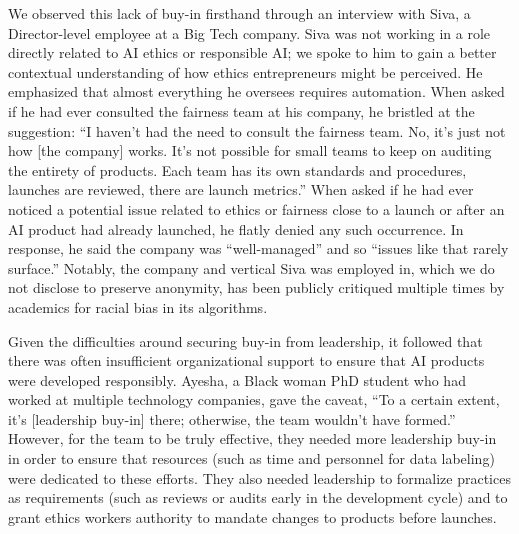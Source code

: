 \documentclass[sigconf]{acmart}
\begin{document}
We observed this lack of buy-in firsthand through an interview with Siva, a Director-level employee at a Big Tech company. Siva was not working in a role directly related to AI ethics or responsible AI; we spoke to him to gain a better contextual understanding of how ethics entrepreneurs might be perceived. He emphasized that almost everything he oversees requires automation. When asked if he had ever consulted the fairness team at his company, he bristled at the suggestion: “I haven’t had the need to consult the fairness team. No, it’s just not how [the company] works. It’s not possible for small teams to keep on auditing the entirety of products. Each team has its own standards and procedures, launches are reviewed, there are launch metrics.” When asked if he had ever noticed a potential issue related to ethics or fairness close to a launch or after an AI product had already launched, he flatly denied any such occurrence. In response, he said the company was “well-managed” and so “issues like that rarely surface.” Notably, the company and vertical Siva was employed in, which we do not disclose to preserve anonymity, has been publicly critiqued multiple times by academics for racial bias in its algorithms.

Given the difficulties around securing buy-in from leadership, it followed that there was often insufficient organizational support to ensure that AI products were developed responsibly. Ayesha, a Black woman PhD student who had worked at multiple technology companies, gave the caveat, “To a certain extent, it’s [leadership buy-in] there; otherwise, the team wouldn’t have formed.” However, for the team to be truly effective, they needed more leadership buy-in in order to ensure that resources (such as time and personnel for data labeling) were dedicated to these efforts. They also needed leadership to formalize practices as requirements (such as reviews or audits early in the development cycle) and to grant ethics workers authority to mandate changes to products before launches.
\end{document}
